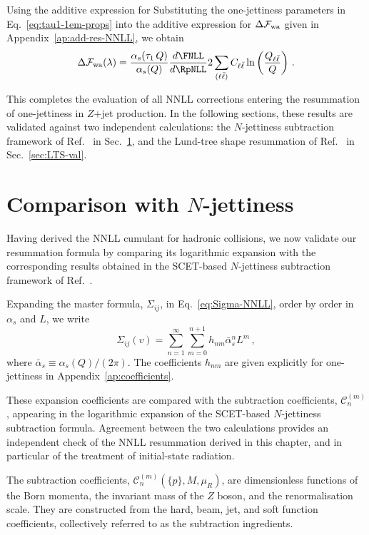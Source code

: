 Using the additive expression for
Substituting the one-jettiness parameters in
Eq.~\eqref{eq:tau1-1em-props} into the additive expression for
$\Delta\mathcal{F}_{\rm wa}$ given in Appendix~\ref{ap:add-res-NNLL}, we obtain
 \begin{equation}
  \label{eq:DFwa-tau_one}
    \Delta \mathcal{F}_{\rm wa}(\lambda) =  \frac{\alpha_s(\tau_1\,Q)}{\alpha_s(Q)}\frac{d\FNLL}{d\RpNLL}2\sum_{(\ell\bar\ell)} C_{\ell\bar\ell}\ln\left(\frac{Q_{\ell\bar\ell}}{Q}\right)\,. 
  \end{equation}
  

This completes the evaluation of all NNLL corrections entering the
resummation of one-jettiness in $Z$+jet production. In the following
sections, these results are validated against two independent
calculations: the $N$-jettiness subtraction framework of
Ref.~\cite{Gaunt:2015pea} in Sec.~\ref{subsec:N-jet-SCET-val}, and the
Lund-tree shape resummation of Ref.~\cite{vanBeekveld:2025zjh} in
Sec.~\ref{sec:LTS-val}.

 \section{Comparison with $N$-jettiness}
 \label{subsec:N-jet-SCET-val}
 
 Having derived the NNLL cumulant for hadronic collisions, we now validate
our resummation formula by comparing its logarithmic expansion with the
corresponding results obtained in the SCET-based $N$-jettiness subtraction
framework of Ref.~\cite{Gaunt:2015pea}.

Expanding the master formula, $\Sigma_{ij}$, in Eq.~\eqref{eq:Sigma-NNLL},
order by order in $\alpha_s$ and $L$, we write~\cite{Banfi:2004yd}
 \begin{equation}
\label{eq:sig-coeff}
	\Sigma_{ij}(v)=\sum_{n=1}^{\infty}\sum_{m=0}^{n+1} h_{nm}\bar{\alpha}^n_sL^m\,,
\end{equation}
where $\bar{\alpha}_s\equiv\alpha_s(Q)/(2\pi)$. The coefficients
$h_{nm}$ are given explicitly for one-jettiness in
Appendix~\ref{ap:coefficients}.

These expansion coefficients are compared with the subtraction coefficients,
$\mathcal{C}_n^{(m)}$, appearing in the logarithmic expansion of the
SCET-based $N$-jettiness subtraction formula. Agreement between the two calculations
provides an independent check of the NNLL resummation derived in this
chapter, and in particular of the treatment of initial-state radiation.

The subtraction coefficients,
$\mathcal{C}_n^{(m)}(\{p\},M,\mu_R)$, are dimensionless functions of the
Born momenta, the invariant mass of the $Z$ boson, and the
renormalisation scale. They are constructed from the hard, beam, jet,
and soft function coefficients, collectively referred to as the subtraction
ingredients.

